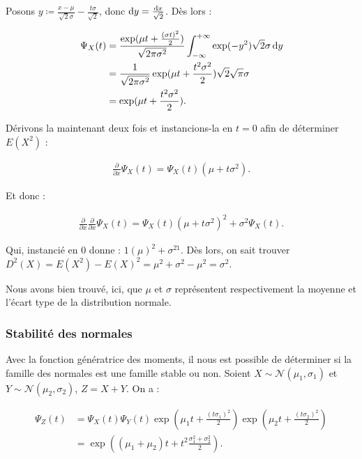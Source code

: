 \documentclass{article}
\renewcommand{\pd}[1]{\frac {\partial}{\partial #1}}
\begin{document}
			Posons $y \coloneqq \frac {x-\mu}{\sqrt 2\sigma} - \frac {t\sigma}{\sqrt 2}$, donc $\dif y = \frac {\dif x}{\sqrt 2}$. Dès lors :

			\begin{align*}
				\Psi_X(t) &= \frac {\exp(\mu t + \frac {(\sigma t)^2}2)}{\sqrt {2\pi\sigma^2}}\int_{-\infty}^{+\infty}\exp(-y^2)\sqrt 2 \sigma \dif y \\
				          &= \frac 1{\sqrt {2\pi\sigma^2}}\exp(\mu t + \frac {t^2\sigma^2}2)\sqrt 2\sqrt \pi \sigma \\
						  &= \exp(\mu t + \frac {t^2\sigma^2}2).
			\end{align*}

			Dérivons la maintenant deux fois et instancions-la en $t = 0$ afin de déterminer $E(X^2)$ :

			\begin{align*}
				\pd x\Psi_X(t) = \Psi_X(t)(\mu  + t\sigma^2).
			\end{align*}

			Et donc :

			\begin{align*}
				\pd x\pd x\Psi_X(t) = \Psi_X(t)(\mu + t\sigma^2)^2 + \sigma^2\Psi_X(t).
			\end{align*}

			Qui, instancié en 0 donne : $1(\mu)^2 + \sigma^21$. Dès lors, on sait trouver $D^2(X) = E(X^2) - E(X)^2 = \mu^2 + \sigma^2 - \mu^2 = \sigma^2$.

			Nous avons bien trouvé, ici, que $\mu$ et $\sigma$ représentent respectivement la moyenne et l'écart type de la distribution normale.

		\subsubsection{Stabilité des normales}
			Avec la fonction génératrice des moments, il nous est possible de déterminer si la famille des normales est une famille stable ou non. Soient $X \sim \mathcal N(\mu_1, \sigma_1)$
			et $Y \sim \mathcal N(\mu_2, \sigma_2)$, $Z = X + Y$. On a :

			\begin{align*}
				\Psi_Z(t) &= \Psi_X(t)\Psi_Y(t)  \exp\left(\mu_1 t + \frac {(t\sigma_1)^2}{2}\right) \exp\left(\mu_2 t + \frac {(t\sigma_2)^2}{2}\right) \\
				          &= \exp\left((\mu_1+\mu_2) t + t^2\frac {\sigma_1^2 + \sigma_2^2}{2}\right).
			\end{align*}
\end{document}
